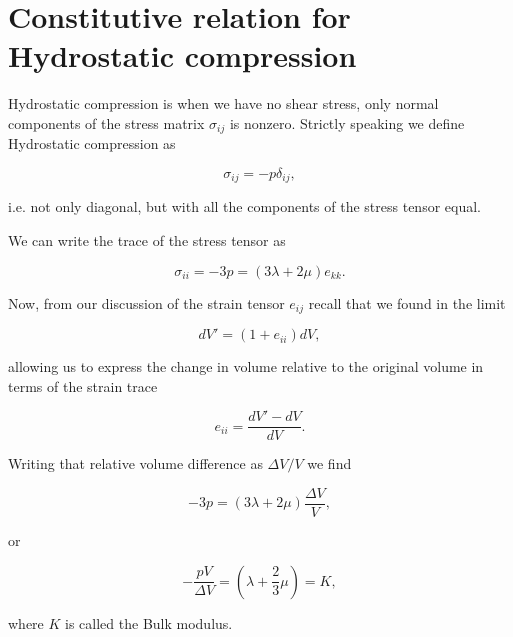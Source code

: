\section{Constitutive relation for Hydrostatic compression}

Hydrostatic compression is when we have no shear stress, only normal components of the stress matrix $\sigma_{ij}$ is nonzero.  Strictly speaking we define Hydrostatic compression as

\begin{equation}\label{eqn:continuumL5:170}
\sigma_{ij} = -p \delta_{ij},
\end{equation}

i.e. not only diagonal, but with all the components of the stress tensor equal.

We can write the trace of the stress tensor as

\begin{equation}\label{eqn:continuumL5:190}
\sigma_{ii} = - 3 p = (3 \lambda + 2 \mu) e_{kk}.
\end{equation}

Now, from our discussion of the strain tensor $e_{ij}$ recall that we found in the limit

\begin{equation}\label{eqn:continuumL5:210}
dV' = (1 + e_{ii}) dV,
\end{equation}

allowing us to express the change in volume relative to the original volume in terms of the strain trace

\begin{equation}\label{eqn:continuumL5:230}
e_{ii} = \frac{dV' - dV}{dV}.
\end{equation}

Writing that relative volume difference as $\Delta V/V$ we find

\begin{equation}\label{eqn:continuumL5:250}
- 3 p = (3 \lambda + 2 \mu) \frac{\Delta V}{V},
\end{equation}

or

\begin{equation}\label{eqn:continuumL5:270}
- \frac{ p V}{\Delta V} = \left( \lambda + \frac{2}{3} \mu \right) = K,
\end{equation}

where $K$ is called the Bulk modulus.

